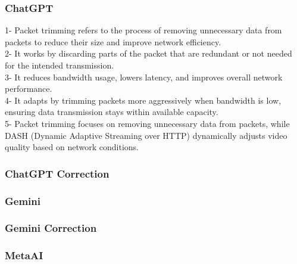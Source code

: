 \subsubsection{ChatGPT}
\begin{tcolorbox}[breakable]
    1- Packet trimming refers to the process of removing unnecessary data from packets to reduce their size and improve network efficiency.\\
2- It works by discarding parts of the packet that are redundant or not needed for the intended transmission.\\
3- It reduces bandwidth usage, lowers latency, and improves overall network performance.\\
4- It adapts by trimming packets more aggressively when bandwidth is low, ensuring data transmission stays within available capacity.\\
5- Packet trimming focuses on removing unnecessary data from packets, while DASH (Dynamic Adaptive Streaming over HTTP) dynamically adjusts video quality based on network conditions.\\

\end{tcolorbox}
\subsubsection{ChatGPT Correction}
\begin{tcolorbox}[breakable]
    
\end{tcolorbox}
\subsubsection{Gemini}
\begin{tcolorbox}[breakable]
    
\end{tcolorbox}
\subsubsection{Gemini Correction}
\begin{tcolorbox}[breakable]
    
\end{tcolorbox}
\subsubsection{MetaAI}
\begin{tcolorbox}[breakable]
    
\end{tcolorbox}
